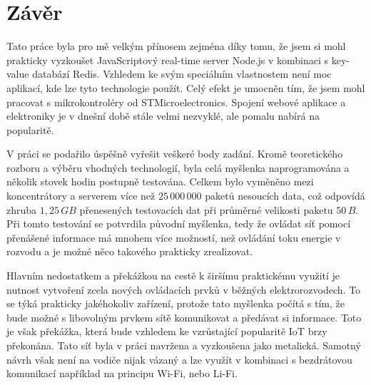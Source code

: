 \chapter{Závěr}
Tato práce byla pro mě velkým přínosem zejména díky tomu, že jsem si mohl prakticky vyzkoušet JavaScriptový real-time server Node.js v kombinaci s key-value databází Redis. Vzhledem ke svým speciálním vlastnostem není moc aplikací, kde lze tyto technologie použít. Celý efekt je umocněn tím, že jsem  mohl pracovat s mikrokontroléry od STMicroelectronics. Spojení webové aplikace a elektroniky je v dnešní době stále velmi nezvyklé, ale pomalu nabírá na popularitě.


V práci se podařilo úspěšně vyřešit veškeré body zadání. Kromě teoretického rozboru a výběru vhodných technologií, byla celá myšlenka naprogramována a několik stovek hodin postupně testována. Celkem bylo vyměněno mezi koncentrátory a serverem více než $25\,000\,000$ paketů nesoucích data, což odpovídá zhruba $1,25\,GB$ přenesených testovacích dat při průměrné velikosti paketu $50\,B$. Při tomto testování se potvrdila původní myšlenka, tedy že ovládat síť pomocí přenášené informace má mnohem více možností, než ovládání toku energie v rozvodu a je možné něco takového prakticky zrealizovat.

Hlavním nedostatkem a překážkou na cestě k širšímu praktickému využití je nutnost vytvoření zcela nových ovládacích prvků v běžných elektrorozvodech. To se týká prakticky jakéhokoliv zařízení, protože tato myšlenka počítá s tím, že bude možné s libovolným prvkem sítě komunikovat a předávat si informace. Toto je však překážka, která bude vzhledem ke vzrůstající popularitě IoT brzy překonána. Tato síť byla v práci navržena a vyzkoušena jako metalická. Samotný návrh však není na vodiče nijak vázaný a lze využít v kombinaci s bezdrátovou komunikací například na principu Wi-Fi, nebo Li-Fi.